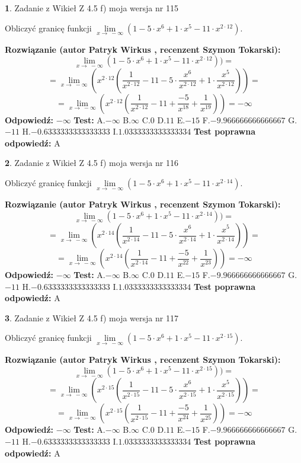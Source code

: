 \documentclass[12pt, a4paper]{article}
\theoremstyle{definition} %
\newtheorem{zad}{}
\newcommand{\zadStart}[1]{\begin{zad}#1\newline}
\newcommand{\zadStop}{\end{zad}}
\newcommand{\rozwStart}[2]{\noindent \textbf{Rozwiązanie (autor #1 , recenzent #2): }\newline}
\newcommand{\rozwStop}{\newline}
\newcommand{\odpStart}{\noindent \textbf{Odpowiedź:}\newline}
\newcommand{\odpStop}{\newline}
\newcommand{\testStart}{\noindent \textbf{Test:}\newline}
\newcommand{\testStop}{\newline}
\newcommand{\kluczStart}{\noindent \textbf{Test poprawna odpowiedź:}\newline}
\newcommand{\kluczStop}{\newline}
\begin{document}
\zadStart{Zadanie z Wikieł Z 4.5 f) moja wersja nr 115}


Obliczyć granicę funkcji  $\lim\limits_{x\to\ -\infty}(1 - 5 \cdot x^{6}+1 \cdot x^{5}- 11 \cdot x^{2\cdot12})$.
\zadStop
\rozwStart{Patryk Wirkus}{Szymon Tokarski}
$$\lim\limits_{x\to\ -\infty}(1 - 5 \cdot x^{6}+1 \cdot x^{5}- 11 \cdot x^{2\cdot12}))=$$
$$=\lim\limits_{x\to\ -\infty}(x^{2\cdot12}(\frac{1}{x^{2\cdot12}}-11 -5 \cdot \frac{x^{6}}{x^{2\cdot12}}+1 \cdot \frac{x^{5}}{x^{2\cdot12}}))=$$
$$=\lim\limits_{x\to\ -\infty}(x^{2\cdot12}(\frac{1}{x^{2\cdot12}}-11 + \frac{-5}{x^{18}}+ \frac{1}{x^{19}}))=-\infty$$
\rozwStop
\odpStart
$-\infty$
\odpStop
\testStart
A.$-\infty$ B.$\infty$ C.$0$ D.$11$ E.$-15$
F.$-9.966666666666667$ G.$-11$
H.$-0.6333333333333333$
I.$1.0333333333333334$
\testStop
\kluczStart
A
\kluczStop



\zadStart{Zadanie z Wikieł Z 4.5 f) moja wersja nr 116}


Obliczyć granicę funkcji  $\lim\limits_{x\to\ -\infty}(1 - 5 \cdot x^{6}+1 \cdot x^{5}- 11 \cdot x^{2\cdot14})$.
\zadStop
\rozwStart{Patryk Wirkus}{Szymon Tokarski}
$$\lim\limits_{x\to\ -\infty}(1 - 5 \cdot x^{6}+1 \cdot x^{5}- 11 \cdot x^{2\cdot14}))=$$
$$=\lim\limits_{x\to\ -\infty}(x^{2\cdot14}(\frac{1}{x^{2\cdot14}}-11 -5 \cdot \frac{x^{6}}{x^{2\cdot14}}+1 \cdot \frac{x^{5}}{x^{2\cdot14}}))=$$
$$=\lim\limits_{x\to\ -\infty}(x^{2\cdot14}(\frac{1}{x^{2\cdot14}}-11 + \frac{-5}{x^{22}}+ \frac{1}{x^{23}}))=-\infty$$
\rozwStop
\odpStart
$-\infty$
\odpStop
\testStart
A.$-\infty$ B.$\infty$ C.$0$ D.$11$ E.$-15$
F.$-9.966666666666667$ G.$-11$
H.$-0.6333333333333333$
I.$1.0333333333333334$
\testStop
\kluczStart
A
\kluczStop



\zadStart{Zadanie z Wikieł Z 4.5 f) moja wersja nr 117}


Obliczyć granicę funkcji  $\lim\limits_{x\to\ -\infty}(1 - 5 \cdot x^{6}+1 \cdot x^{5}- 11 \cdot x^{2\cdot15})$.
\zadStop
\rozwStart{Patryk Wirkus}{Szymon Tokarski}
$$\lim\limits_{x\to\ -\infty}(1 - 5 \cdot x^{6}+1 \cdot x^{5}- 11 \cdot x^{2\cdot15}))=$$
$$=\lim\limits_{x\to\ -\infty}(x^{2\cdot15}(\frac{1}{x^{2\cdot15}}-11 -5 \cdot \frac{x^{6}}{x^{2\cdot15}}+1 \cdot \frac{x^{5}}{x^{2\cdot15}}))=$$
$$=\lim\limits_{x\to\ -\infty}(x^{2\cdot15}(\frac{1}{x^{2\cdot15}}-11 + \frac{-5}{x^{24}}+ \frac{1}{x^{25}}))=-\infty$$
\rozwStop
\odpStart
$-\infty$
\odpStop
\testStart
A.$-\infty$ B.$\infty$ C.$0$ D.$11$ E.$-15$
F.$-9.966666666666667$ G.$-11$
H.$-0.6333333333333333$
I.$1.0333333333333334$
\testStop
\kluczStart
A
\kluczStop
\end{document}
